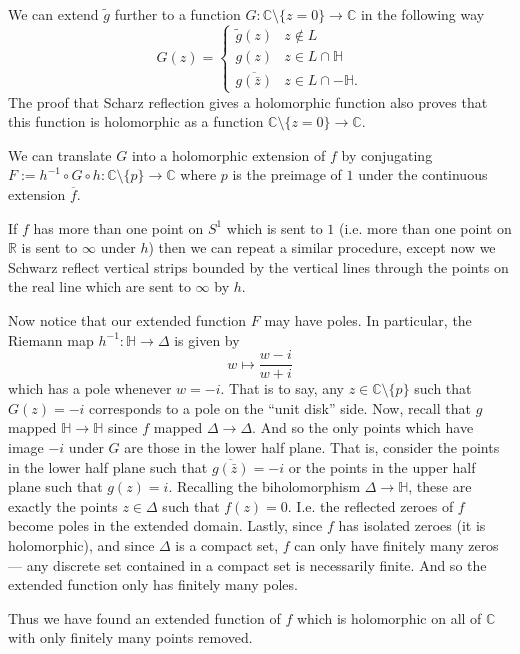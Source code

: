 \documentclass[12pt,letterpaper,boxed]{hmcpset}
\newcommand{\R}{\mathbb R}
\newcommand{\C}{\mathbb C}
\renewcommand{\H}{\mathbb H}
\newcommand{\inv}{^{-1}}
\begin{document}
\begin{solution}
We can extend $\tilde g$ further to a function $G: \C \setminus
\{z=0\} \to \C$ in the following way
\[
	G(z) = \begin{cases}
		\tilde g(z) & z \not\in L \\
		g(z) & z \in L \cap \H \\
		\overline{g(\bar z)} & z \in L \cap -\H.
	\end{cases}
\]
The proof that Scharz reflection gives a holomorphic function also
proves that this function is holomorphic as a function $\C \setminus
\{z = 0 \} \to \C$. 

We can translate $G$ into a holomorphic extension of $f$ by
conjugating $F := h\inv \circ G \circ h : \C \setminus \{p\} \to \C$ where
$p$ is the preimage of $1$ under the continuous extension $\overline
f$.

If $f$ has more than one point on $S^1$ which is sent to $1$ (i.e.
more than one point on $\R$ is sent to $\infty$ under $h$) then we can
repeat a similar procedure, except now we Schwarz reflect vertical
strips bounded by the vertical lines through the points on the real
line which are sent to $\infty$ by $h$. 

Now notice that our extended function $F$ may have poles. 
In particular, the Riemann map $h\inv: \H \to \Delta$
is given by
\[
	w \mapsto \frac{w - i}{w+i}
\]
which has a pole whenever $w = -i$. That is to say, any $z \in \C
\setminus \{p\}$ such that $G(z) = -i$ corresponds to a pole on the
``unit disk'' side. 
Now, recall that $g$ mapped $\H \to \H$ since $f$ mapped $\Delta \to
\Delta$. And so the only points which have image $-i$ under $G$ are
those in the lower half plane. That is, consider the points in the
lower half plane such that $\overline{g(\bar z)} = -i$ or the points
in the upper half plane such that $g(z) = i$. Recalling the
biholomorphism $\Delta \to \H$, these are exactly the points $z \in
\Delta$ such that $f(z) = 0$. I.e. the reflected zeroes of $f$ become
poles in the extended domain.
Lastly, since $f$ has isolated zeroes (it is holomorphic), and 
 since $\Delta$ is a compact set, 
$f$ can only have finitely many zeros --- any discrete set contained
in a compact set is necessarily finite.
And so the extended function only has finitely many poles.

Thus we have found an extended function of $f$ which is holomorphic on
all of $\C$ with only finitely many points removed.










\end{solution}
\end{document}

